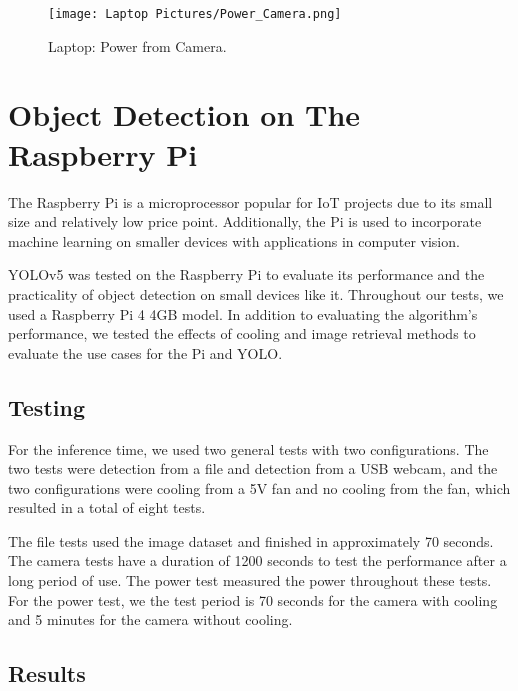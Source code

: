 \documentclass[Report]{IEEEtran}
\begin{document}
\begin{figure}[htbp]
\centerline{\texttt{[image: Laptop Pictures/Power\_Camera.png]}}
\caption{Laptop: Power from Camera.}
\label{fig}
\end{figure}


\section{Object Detection on The Raspberry Pi}
The Raspberry Pi is a microprocessor popular for IoT projects due to its small size and relatively low price point. Additionally, the Pi is used to incorporate machine learning on smaller devices with applications in computer vision.

YOLOv5 was tested on the Raspberry Pi to evaluate its performance and the practicality of object detection on small devices like it. Throughout our tests, we used a Raspberry Pi 4 4GB model. In addition to evaluating the algorithm's performance, we tested the effects of cooling and image retrieval methods to evaluate the use cases for the Pi and YOLO.

\subsection{Testing}
For the inference time, we used two general tests with two configurations. The two tests were detection from a file and detection from a USB webcam, and the two configurations were cooling from a 5V fan and no cooling from the fan, which resulted in a total of eight tests.

The file tests used the image dataset and finished in approximately 70 seconds. The camera tests have a duration of 1200 seconds to test the performance after a long period of use. The power test measured the power throughout these tests. For the power test, we the test period is 70 seconds for the camera with cooling and 5 minutes for the camera without cooling.

\subsection{Results}
\end{document}
